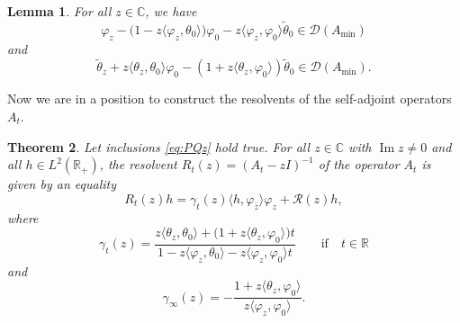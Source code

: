 \documentclass[10pt,a4paper]{amsart}
\numberwithin{equation}{section}
\newtheorem{Theorem}{Theorem}[section]
\newtheorem{Lemma}[Theorem]{Lemma}
\begin{document}
 \begin{Lemma}\label{PQ+}
 For all $z \in {\mathbb C}$, we have
 \[
\varphi_{z} -\big( 1-z \langle \varphi_{z}, \theta_{0} \rangle \big) \varphi_{0} - z \langle \varphi_{z}, \varphi_0\rangle \tilde\theta_{0} \in {\mathcal D} (A_{\min})
\]
and
 \[
\tilde\theta_{z} + z \langle \theta_{z}, \theta_0\rangle \varphi_0 - (1+z \langle \theta_{z}, \varphi_{0}\rangle ) \tilde\theta_{0} \in {\mathcal D} (A_{\min}).
\]
 \end{Lemma}

 Now we are in a position to construct the resolvents of the self-adjoint operators $A_t$.


 \begin{Theorem}\label{RES}
 Let inclusions \eqref{eq:PQz} hold true.
 For all $z\in {\mathbb C}$ with $\operatorname{Im} z\neq 0$ and all $h\in L^2 ({\mathbb R}_{+})$, the resolvent $R_t (z)= (A_t-zI)^{-1}$ of the operator $A_t$ is given by an equality
 \begin{equation}
R_{t} (z) h = \gamma_{t} (z) \langle h, \varphi_{\bar{z}}\rangle \varphi_{z}+ {\mathcal R}(z)h,
 \label{eq:RES1}\end{equation}
 where
 \begin{equation}
\gamma_{t}(z)= \frac{z \langle \theta_{z}, \theta_{0}\rangle +\big( 1+ z \langle \theta_{z}, \varphi_{0}\rangle \big)t }
{1- z \langle \varphi_{z}, \theta_{0}\rangle -z \langle \varphi_{z}, \varphi_{0}\rangle t } \qquad \mbox{if} \quad t\in {\mathbb R}
 \label{eq:RES2}\end{equation}
 and
 \begin{equation}
\gamma_{\infty}(z)= - \frac{ 1+ z \langle \theta_{z}, \varphi_{0}\rangle }
{z \langle \varphi_{z}, \varphi_{0}\rangle }.
 \label{eq:RES3}\end{equation}
 \end{Theorem}
\end{document}
